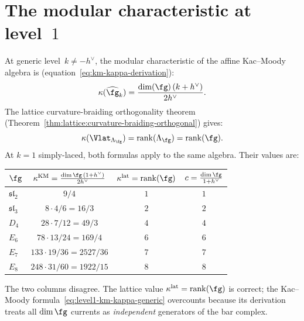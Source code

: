 \section{The modular characteristic at level~$1$}%
\label{sec:level1-kappa}

At generic level~$k \neq -h^\vee$, the modular characteristic
of the affine Kac--Moody algebra is
(equation~\eqref{eq:km-kappa-derivation}):
\begin{equation}\label{eq:level1-km-kappa-generic}
\kappa(\widehat{\fg}_k)
= \frac{\dim(\fg)\,(k + h^\vee)}{2h^\vee}.
\end{equation}
The lattice curvature-braiding orthogonality theorem
(Theorem~\ref{thm:lattice:curvature-braiding-orthogonal})
gives:
\begin{equation}\label{eq:level1-lattice-kappa}
\kappa(\Vlat_{\Lambda_\fg})
= \operatorname{rank}(\Lambda_\fg)
= \operatorname{rank}(\fg).
\end{equation}
At $k = 1$ simply-laced, both formulas apply to the
same algebra. Their values are:
\begin{center}
\renewcommand{\arraystretch}{1.3}
\begin{tabular}{lccc}
\toprule
$\fg$ & $\kappa^{\mathrm{KM}}
 = \frac{\dim\fg\,(1+h^\vee)}{2h^\vee}$
 & $\kappa^{\mathrm{lat}} = \operatorname{rank}(\fg)$
 & $c = \frac{\dim\fg}{1+h^\vee}$ \\
\midrule
$\mathfrak{sl}_2$
 & $9/4$
 & $1$
 & $1$ \\
$\mathfrak{sl}_3$
 & $8 \cdot 4/6 = 16/3$
 & $2$
 & $2$ \\
$D_4$
 & $28 \cdot 7/12 = 49/3$
 & $4$
 & $4$ \\
$E_6$
 & $78 \cdot 13/24 = 169/4$
 & $6$
 & $6$ \\
$E_7$
 & $133 \cdot 19/36 = 2527/36$
 & $7$
 & $7$ \\
$E_8$
 & $248 \cdot 31/60 = 1922/15$
 & $8$
 & $8$ \\
\bottomrule
\end{tabular}
\end{center}
The two columns disagree. The lattice value
$\kappa^{\mathrm{lat}} = \operatorname{rank}(\fg)$ is
correct; the Kac--Moody formula~\eqref{eq:level1-km-kappa-generic}
overcounts because its derivation treats all
$\dim\fg$ currents as \emph{independent} generators
of the bar complex.

